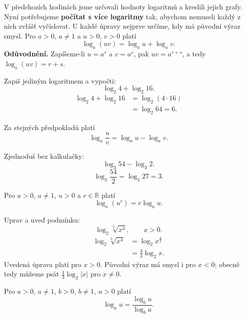 \documentclass[11pt,a4paper]{article}
\begin{document}
V předchozích hodinách jsme určovali hodnoty logaritmů a kreslili jejich grafy. Nyní potřebujeme \textbf{počítat s více logaritmy} tak, abychom nemuseli každý z nich zvlášť vyčíslovat. U každé úpravy nejprve určíme, kdy má původní výraz smysl.
Pro $a>0$, $a\ne1$ a $u>0$, $v>0$ platí
\[
\log_a(uv)=\log_a u+\log_a v.
\]
\textbf{Odůvodnění.} Zapíšeme-li $u=a^r$ a $v=a^s$, pak $uv=a^{r+s}$, a tedy $\log_a(uv)=r+s$.
\begin{prikladReseniBox}[title={Příklad 1}]
Zapiš jediným logaritmem a vypočti:
\[
\log_2 4+\log_2 16.
\]
\tcblower
\[
\begin{aligned}
\log_2 4+\log_2 16&=\log_2(4\cdot16)\\
&=\log_2 64=6.
\end{aligned}
\]
\end{prikladReseniBox}
Za stejných předpokladů platí
\[
\log_a\frac uv=\log_a u-\log_a v.
\]
\begin{prikladReseniBox}[title={Příklad 2}]
Zjednoduš bez kalkulačky:
\[
\log_3 54-\log_3 2.
\]
\tcblower
\[
\log_3\frac{54}{2}=\log_3 27=3.
\]
\end{prikladReseniBox}
Pro $a>0$, $a\ne1$, $u>0$ a $r\in\mathbb R$ platí
\[
\log_a(u^r)=r\log_a u.
\]

\begin{prikladReseniBox}[title={Příklad 3}]
Uprav a uveď podmínku:
\[
\log_2\sqrt[3]{x^4},\qquad x>0.
\]
\tcblower
\[
\begin{aligned}
\log_2\sqrt[3]{x^4}&=\log_2 x^{\frac43}\\
&=\frac43\log_2 x.
\end{aligned}
\]
Uvedená úprava platí pro $x>0$. Původní výraz má smysl i pro $x<0$; obecně tedy můžeme psát $\frac43\log_2|x|$ pro $x\ne0$.
\end{prikladReseniBox}
Pro $a>0$, $a\ne1$, $b>0$, $b\ne1$, $u>0$ platí
\[
\log_a u=\frac{\log_b u}{\log_b a}.
\]
\end{document}
